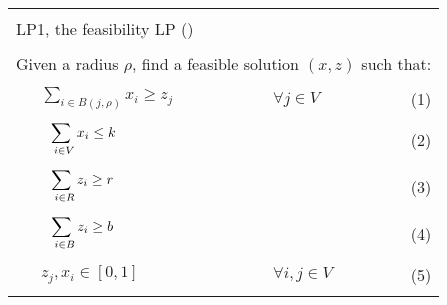 \renewcommand{\arraystretch}{0.505}
\begin{tabularx}{\linewidth}{|lllr|}
    \hline
    & & &\tabularnewline
    \multicolumn{4}{|X|}{LP1, the feasibility LP (\cite{bandyapadhyay_constant_2019})} \tabularnewline
    \hline
    & & &\tabularnewline
    \multicolumn{4}{|X|}{Given a radius $\rho$, find a feasible solution $(x,z)$ such that:} \tabularnewline
    & & &\tabularnewline
    \hphantom{.....}& $\displaystyle \sum_{i\in B(j,\rho)} x_i\geq z_j$ & $\forall j\in V$&(1)\tabularnewline
    & & &\tabularnewline
    \hphantom{.....}& $\displaystyle \hphantom{.}\sum_{\hphantom{..}i\in V} x_i\leq k\hphantom{..}$ & &(2)\tabularnewline
    & & &\tabularnewline
    \hphantom{.....}& $\displaystyle \hphantom{.}\sum_{\hphantom{..}i\in R} z_i\geq r\hphantom{..}$ & &(3)\tabularnewline
    & & &\tabularnewline
    \hphantom{.....}& $\displaystyle \hphantom{.}\sum_{\hphantom{..}i\in B} z_i\geq b\hphantom{..}$ & &(4)\tabularnewline
    & & &\tabularnewline
    \hphantom{.....}& $z_j,x_i\in [0,1]$ & $\forall i,j\in V$ &(5)\tabularnewline
    & & &\tabularnewline
    \hline
\end{tabularx}%
\renewcommand{\arraystretch}{1}
